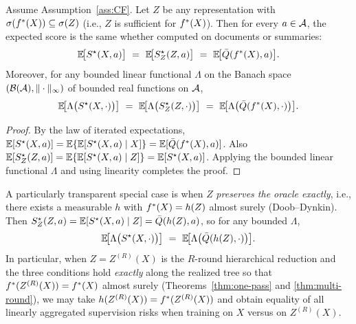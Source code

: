 \begin{lemma}
\label{lem:blackwell-transport-appendix}
Assume Assumption~\ref{ass:CF}. Let $Z$ be any representation with $\sigma(f^{\ast}(X))\subseteq\sigma(Z)$ (i.e., $Z$ is sufficient for $f^{\ast}(X)$).
Then for every $a\in\mathcal{A}$, the expected score is the same whether computed on documents or summaries:
\[
\E\!\big[\sstar(X,a)\big]\ =\ \E\!\big[\sstar_Z(Z,a)\big]\ =\ \E\!\big[\bar Q(\fstar(X),a)\big].
\]
Moreover, for any bounded linear functional $\Lambda$ on the Banach space $(\mathcal{B}(\mathcal{A}),\|\cdot\|_\infty)$ of bounded real functions on $\mathcal{A}$,
\[
\mathbb{E}\!\big[\Lambda\big(S^\star(X,\cdot)\big)\big]
\ =\
\mathbb{E}\!\big[\Lambda\big(S^\star_Z(Z,\cdot)\big)\big]
\ =\
\mathbb{E}\!\big[\Lambda\big(\bar Q(f^{\ast}(X),\cdot)\big)\big].
\]
\end{lemma}

\begin{proof}
By the law of iterated expectations,
$\mathbb{E}[S^\star(X,a)]=\mathbb{E}\{\mathbb{E}[S^\star(X,a)\mid X]\}=\mathbb{E}[\bar Q(f^{\ast}(X),a)]$.
Also $\mathbb{E}[S^\star_Z(Z,a)]=\mathbb{E}\{\mathbb{E}[S^\star(X,a)\mid Z]\}=\mathbb{E}[S^\star(X,a)]$.
Applying the bounded linear functional $\Lambda$ and using linearity completes the proof.
\end{proof}

A particularly transparent special case is when $Z$ \emph{preserves the oracle exactly}, i.e., there exists a measurable $h$ with $f^{\ast}(X)=h(Z)$ almost surely (Doob–Dynkin). Then
$S^\star_Z(Z,a)=\mathbb{E}[S^\star(X,a)\mid Z]=\bar Q(h(Z),a)$, so for any bounded $\Lambda$,
\[
\E\!\big[\Lambda\big(\sstar(X,\cdot)\big)\big]\ =\ \E\!\big[\Lambda\big(\bar Q(h(Z),\cdot)\big)\big].
\]
In particular, when $Z=Z^{(R)}(X)$ is the $R$-round hierarchical reduction and the three conditions hold \emph{exactly} along the realized tree so that $f^{\ast}(Z^{(R)}(X))=f^{\ast}(X)$ almost surely (Theorems~\ref{thm:one-pass} and \ref{thm:multi-round}), we may take $h(Z^{(R)}(X))=f^{\ast}(Z^{(R)}(X))$ and obtain equality of all linearly aggregated supervision risks when training on $X$ versus on $Z^{(R)}(X)$.





